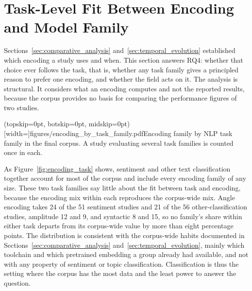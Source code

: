 \documentclass{ieeeaccess}
\begin{document}
\section{Task-Level Fit Between Encoding and Model Family}
\label{sec:task_fit}

Sections~\ref{sec:comparative_analysis} and~\ref{sec:temporal_evolution} established which encoding a study uses and when. This section answers RQ4: whether that choice ever follows the task, that is, whether any task family gives a principled reason to prefer one encoding, and whether the field acts on it. The analysis is structural. It considers what an encoding computes and not the reported results, because the corpus provides no basis for comparing the performance figures of two studies.

\Figure[t!](topskip=0pt, botskip=0pt, midskip=0pt)[width=\textwidth]{figures/encoding_by_task_family.pdf}{Encoding family by NLP task family in the final corpus. A study evaluating several task families is counted once in each.\label{fig:encoding_task}}

As Figure~\ref{fig:encoding_task} shows, sentiment and other text classification together account for most of the corpus and include every encoding family of any size.
These two task families say little about the fit between task and encoding, because the encoding mix within each reproduces the corpus-wide mix. Angle encoding takes 24 of the 51 sentiment studies and 21 of the 56 other-classification studies, amplitude 12 and 9, and syntactic 8 and 15, so no family's share within either task departs from its corpus-wide value by more than eight percentage points. The distribution is consistent with the corpus-wide habits documented in Sections~\ref{sec:comparative_analysis} and~\ref{sec:temporal_evolution}, mainly which toolchain and which pretrained embedding a group already had available, and not with any property of sentiment or topic classification.
Classification is thus the setting where the corpus has the most data and the least power to answer the question.
\end{document}
